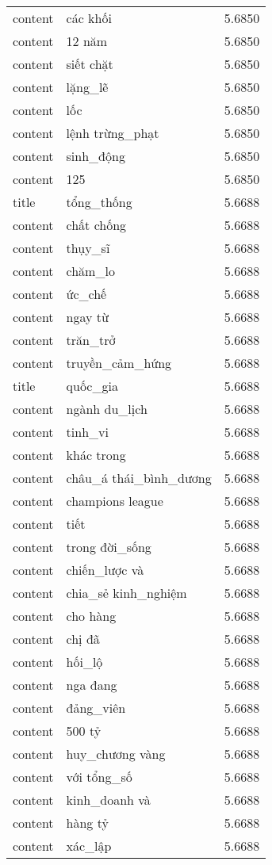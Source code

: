 \documentclass{article}
\begin{document}
\begin{tabular}{lll}
content & các khối & 5.6850\\
content & 12 năm & 5.6850\\
content & siết chặt & 5.6850\\
content & lặng\_lẽ & 5.6850\\
content & lốc & 5.6850\\
content & lệnh trừng\_phạt & 5.6850\\
content & sinh\_động & 5.6850\\
content & 125 & 5.6850\\
title & tổng\_thống & 5.6688\\
content & chất chống & 5.6688\\
content & thụy\_sĩ & 5.6688\\
content & chăm\_lo & 5.6688\\
content & ức\_chế & 5.6688\\
content & ngay từ & 5.6688\\
content & trăn\_trở & 5.6688\\
content & truyền\_cảm\_hứng & 5.6688\\
title & quốc\_gia & 5.6688\\
content & ngành du\_lịch & 5.6688\\
content & tinh\_vi & 5.6688\\
content & khác trong & 5.6688\\
content & châu\_á thái\_bình\_dương & 5.6688\\
content & champions league & 5.6688\\
content & tiết & 5.6688\\
content & trong đời\_sống & 5.6688\\
content & chiến\_lược và & 5.6688\\
content & chia\_sẻ kinh\_nghiệm & 5.6688\\
content & cho hàng & 5.6688\\
content & chị đã & 5.6688\\
content & hối\_lộ & 5.6688\\
content & nga đang & 5.6688\\
content & đảng\_viên & 5.6688\\
content & 500 tỷ & 5.6688\\
content & huy\_chương vàng & 5.6688\\
content & với tổng\_số & 5.6688\\
content & kinh\_doanh và & 5.6688\\
content & hàng tỷ & 5.6688\\
content & xác\_lập & 5.6688\\

\end{tabular}
\end{document}
